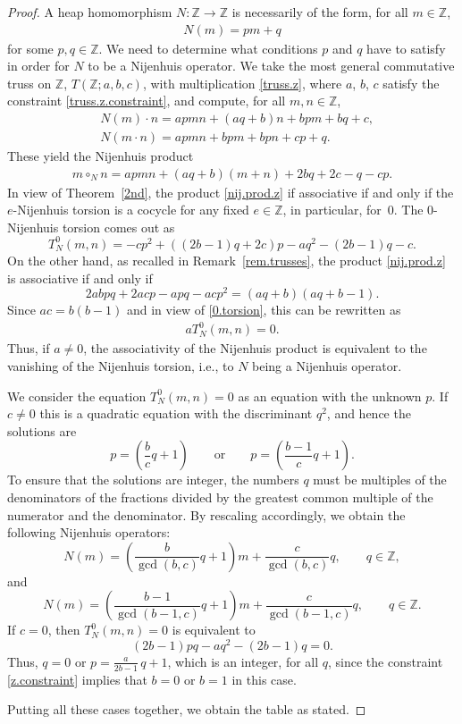 \documentclass[10pt,a4paper]{amsart}
\numberwithin{equation}{section}
\newcommand{\Z}{\mathbb Z}
\begin{document}
\begin{proof}
A heap homomorphism $N\colon \Z\to \Z$ is necessarily of the form, for all $m\in \Z$,
 \begin{gather*}%
 N(m) = pm +q
 \end{gather*}
for some $p,q\in \Z$. We need to determine what conditions $p$ and $q$ have to satisfy in order for $N$ to be a Nijenhuis operator. We take the most general commutative truss on $\Z$, $T(\Z;a,b,c)$, with multiplication \eqref{truss.z}, where $a$, $b$, $c$ satisfy the constraint \eqref{truss.z.constraint}, and compute, for all $m,n\in \Z$,
\begin{align*}
 &N(m)\cdot n = apmn +(aq+b)n +bpm +bq +c,\\
 &N(m\cdot n) = apmn +bpm +bpn +cp +q.
\end{align*}
These yield the Nijenhuis product
\begin{gather}\label{nij.prod.z}
m\circ_N n = apmn + (aq+b)(m+n) +2bq +2c -q -cp.
\end{gather}
In view of Theorem~\ref{2nd}, the product \eqref{nij.prod.z} if associative if and only if the $e$-Nijenhuis torsion is a cocycle for any fixed $e\in \Z$, in particular, for~0. The $0$-Nijenhuis torsion comes out as
\begin{equation}\label{0.torsion}
 T_N^0(m,n)= -cp^2+ ((2b-1)q +2c)p - aq^2 - (2b-1)q -c.
\end{equation}
On the other hand, as recalled in Remark~\ref{rem.trusses}, the product \eqref{nij.prod.z} is associative if and only if
\begin{equation}\label{z.constraint}
 2 abpq + 2acp - apq-acp^2 = (aq+b)(aq+b-1).
\end{equation}
Since $ac=b(b-1)$ and in view of \eqref{0.torsion}, this can be rewritten as
\begin{gather*}\label{constraint}
 aT_N^0(m,n)=0.
\end{gather*}
Thus, if $a\neq 0$, the associativity of the Nijenhuis product is equivalent to the vanishing of the Nijenhuis torsion, i.e., to $N$ being a Nijenhuis operator.

We consider the equation $T_N^0(m,n)=0$ as an equation with the unknown $p$. If $c\neq 0$ this is a quadratic equation with the discriminant $q^2$, and hence the solutions are
\[
p= \left(\frac{b}{c} q +1\right)\qquad \mbox{or}\qquad p= \left(\frac{b-1}{c} q +1\right).
\]
To ensure that the solutions are integer, the numbers $q$ must be multiples of the denominators of the fractions divided by the greatest common multiple of the numerator and the denominator. By rescaling accordingly, we obtain the following Nijenhuis operators:
\[
N(m) = \left(\frac{b}{\gcd(b,c)} q +1\right)m + \frac{c}{\gcd(b,c)} q, \qquad q\in \Z,
\]
and
\[
N(m) = \left(\frac{b-1}{\gcd(b-1,c)} q +1\right)m + \frac{c}{\gcd(b-1,c)} q, \qquad q\in \Z.
\]
If $c=0$, then $T_N^0(m,n)=0$ is equivalent to
\[
(2b-1)pq - aq^2 - (2b-1)q=0.
\]
Thus, $q=0$ or $p=\frac{a}{2b-1}\, q +1$, which is an integer, for all $q$, since the constraint \eqref{z.constraint} implies that $b=0$ or $b=1$ in this case.

Putting all these cases together, we obtain the table as stated.
\end{proof}
\end{document}
